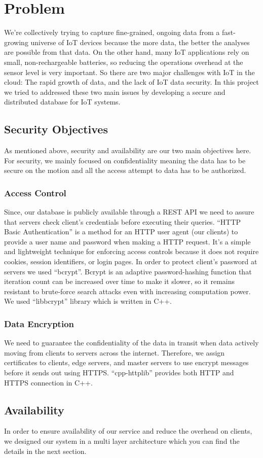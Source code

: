 \section{Problem}
\label{sec:Solution}
 We’re collectively trying to capture fine-grained, ongoing data from a fast-growing universe of IoT devices because the more data, the better the analyses are possible from that data. On the other hand, many IoT applications rely on small, non-rechargeable batteries, so reducing the operations overhead at the sensor level is very important. So there are two major challenges with IoT in the cloud: The rapid growth of data, and the lack of IoT data security. In this project we tried to addressed these two main issues by developing a secure and distributed database for IoT systems. 

\subsection{Security Objectives}

As mentioned above, security and availability are our two main objectives here. For security, we mainly focused on confidentiality meaning the data has to be secure on the motion and all the access attempt to data has to be authorized.
\subsubsection{Access Control}
Since, our database is publicly available through a REST API we need to assure that servers check client's credentials before executing their queries. ``HTTP Basic Authentication'' is a method for an HTTP user agent (our clients) to provide a user name and password when making a HTTP request. It's a simple and lightweight technique for enforcing access controls because it does not require cookies, session identifiers, or login pages. In order to protect client's password at servers we used ``bcrypt''. Bcrypt is an adaptive password-hashing function that iteration count can be increased over time to make it slower, so it remains resistant to brute-force search attacks even with increasing computation power. We used ``libbcrypt'' library \cite{libbcrypt} which is written in C++. 

\subsubsection{Data Encryption}
We need to guarantee the confidentiality of the data in transit when data actively moving from clients to servers across the internet. Therefore, we assign certificates to clients, edge servers, and master servers to use encrypt messages before it sends out using HTTPS. ``cpp-httplib'' \cite{httplib} provides both HTTP and HTTPS connection in C++.

\subsection{Availability}
In order to ensure availability of our service and reduce the overhead on clients, we designed our system in a multi layer architecture which you can find the details in the next section. 
